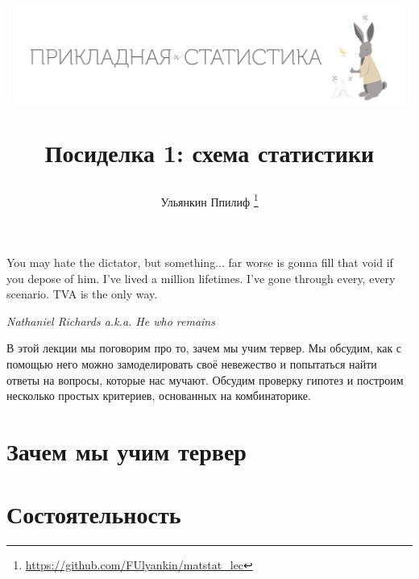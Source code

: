 \documentclass[12pt, a4paper, oneside]{article}
\title{
\begin{center} 
\includegraphics[width=0.99\textwidth]{logo.png}
\end{center}

Посиделка 1: схема статистики}
\date{ } %
\author{Ульянкин Ппилиф \thanks{\url{https://github.com/FUlyankin/matstat\_lec}}}
\begin{document}

\maketitle

\epigraph{You may hate the dictator, but something... far worse is gonna fill that void if you depose of him. I've lived a million lifetimes. I've gone through every, every scenario. TVA is the only way.}{\textit{Nathaniel Richards a.k.a. He who remains}}


В этой лекции мы поговорим про то, зачем мы учим тервер. Мы обсудим, как с помощью него можно замоделировать своё невежество и попытаться найти ответы на вопросы, которые нас мучают. Обсудим проверку гипотез и построим несколько простых критериев, основанных на комбинаторике.


\section{Зачем мы учим тервер}


\section{Состоятельность}







\end{document}
